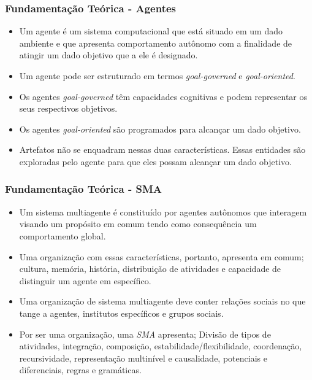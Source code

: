 \documentclass{beamer}
\begin{document}
\begin{frame}
\frametitle{Fundamentação Teórica - Agentes}
	\begin{itemize}
		\item Um agente é um sistema computacional que está situado em um dado ambiente e que apresenta comportamento autônomo com a finalidade de atingir um dado objetivo que a ele é designado. 
		\item Um agente pode ser estruturado em termos \textit{goal-governed} e \textit{goal-oriented}.
		\item Os agentes \textit{goal-governed} têm capacidades cognitivas e podem representar os seus respectivos objetivos. 
		\item Os agentes \textit{goal-oriented} são programados para alcançar um dado objetivo. 
		\item Artefatos não se enquadram nessas duas características. Essas entidades são exploradas pelo agente para que eles possam alcançar um dado objetivo. 
	\end{itemize}
\end{frame}

\begin{frame}
\frametitle{Fundamentação Teórica - SMA}
	\begin{itemize}
		\item Um sistema multiagente é constituído por agentes autônomos que interagem visando um propósito em comum tendo como consequência um comportamento global. 
		\item Uma organização com essas características, portanto, apresenta em comum; cultura, memória, história, distribuição de atividades e capacidade de distinguir um agente em específico. 
		\item Uma organização de sistema multiagente deve conter relações sociais no que tange a agentes, institutos específicos e grupos sociais. 
		\item Por ser uma organização, uma \textit{SMA} apresenta; Divisão de tipos de atividades, integração, composição, estabilidade/flexibilidade, coordenação, recursividade, representação multinível e causalidade, potenciais e diferenciais, regras e gramáticas.
	\end{itemize}
\end{frame}
\end{document}
